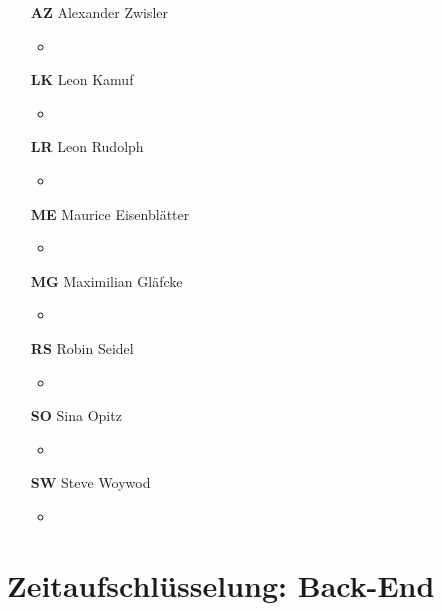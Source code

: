 \documentclass[11pt,a4paper]{report}
\begin{document}
\begin{itemize}
\item[\textbf{AZ}] Alexander Zwisler
	\begin{itemize}
		\item 
	\end{itemize}
\item[\textbf{LK}] Leon Kamuf
	\begin{itemize}
		\item
	\end{itemize}
\item[\textbf{LR}] Leon Rudolph
	\begin{itemize}
		\item
	\end{itemize}
\item[\textbf{ME}] Maurice Eisenblätter
	\begin{itemize}
		\item
	\end{itemize}
\item[\textbf{MG}] Maximilian Gläfcke
	\begin{itemize}
		\item
	\end{itemize}
\item[\textbf{RS}] Robin Seidel
	\begin{itemize}
		\item
	\end{itemize}
\item[\textbf{SO}] Sina Opitz
	\begin{itemize}
		\item
	\end{itemize}
\item[\textbf{SW}] Steve Woywod
	\begin{itemize}
		\item
	\end{itemize}
\end{itemize}

\newpage

\section{Zeitaufschlüsselung: Back-End}

\end{document}
